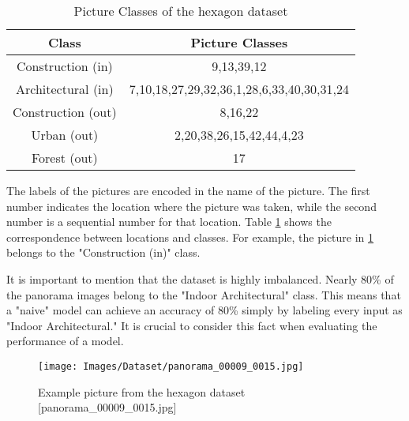 \begin{table}
    \centering
    \begin{tabular}{cc}
    \toprule
    \textbf{Class}& \textbf{Picture Classes}\\ \midrule
    Construction (in) & 9,13,39,12 \\ \hline
    Architectural (in)& 7,10,18,27,29,32,36,1,28,6,33,40,30,31,24\\ \hline
    Construction (out)& 8,16,22\\ \hline
    Urban (out)& 2,20,38,26,15,42,44,4,23\\ \hline
    Forest (out)& 17\\
    \bottomrule
    \end{tabular}
    \caption{Picture Classes of the hexagon dataset
        \label{tab:dataset:piccoding}}
\end{table}
The labels of the pictures are encoded in the name of the picture. 
The first number indicates the location where the picture was taken, 
while the second number is a sequential number for that location.
Table \ref{tab:dataset:piccoding} shows the correspondence between locations and classes. 
For example, the picture in \cref{fig:dataset:examplepic} belongs to the "Construction (in)" class.

It is important to mention that the dataset is highly imbalanced. 
Nearly 80\% of the panorama images belong to the "Indoor Architectural" class. 
This means that a "naive" model can achieve an accuracy of 80\% simply by labeling every input as "Indoor Architectural." 
It is crucial to consider this fact when evaluating the performance of a model.

\begin{figure}
    \centering
    \texttt{[image: Images/Dataset/panorama\_00009\_0015.jpg]}
    \caption{Example picture from the hexagon dataset [panorama\_00009\_0015.jpg]}
    \label{fig:dataset:examplepic}
\end{figure}


